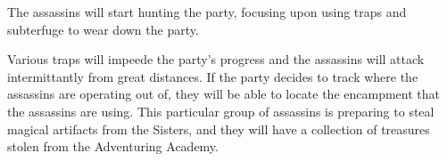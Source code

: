 The assassins will start hunting the party, focusing upon using traps and subterfuge to wear down the party.

Various traps will impeede the party's progress and the assassins will attack intermittantly from great distances.
If the party decides to track where the assassins are operating out of, they will be able to locate the encampment that the assassins are using.
This particular group of assassins is preparing to steal magical artifacts from the Sisters, and they will have a collection of treasures stolen from the Adventuring Academy.